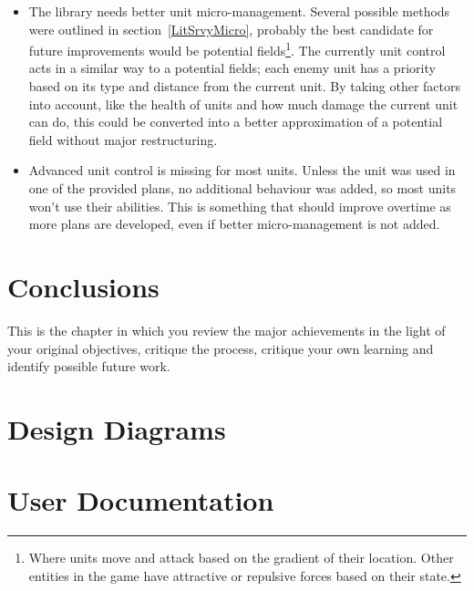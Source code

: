 \documentclass[11pt,openright,a4paper]{report}
\begin{document}
\begin{itemize}
\item{The library needs better unit micro-management. Several possible methods were outlined in section~\ref{LitSrvyMicro}, probably the best candidate for future improvements would be potential fields\footnote{Where units move and attack based on the gradient of their location. Other entities in the game have attractive or repulsive forces based on their state.}. The currently unit control acts in a similar way to a potential fields; each enemy unit has a priority based on its type and distance from the current unit. By taking other factors into account, like the health of units and how much damage the current unit can do, this could be converted into a better approximation of a potential field without major restructuring.}
\item{Advanced unit control is missing for most units. Unless the unit was used in one of the provided plans, no additional behaviour was added, so most units won't use their abilities. This is something that should improve overtime as more plans are developed, even if better micro-management is not added.}
\end{itemize}










\chapter{Conclusions}
%

This is the chapter in which you review the major achievements in the
light of your original objectives, critique the process, critique your
own learning and identify possible future work.



\appendix


\chapter{Design Diagrams}

\chapter{User Documentation}
\end{document}
